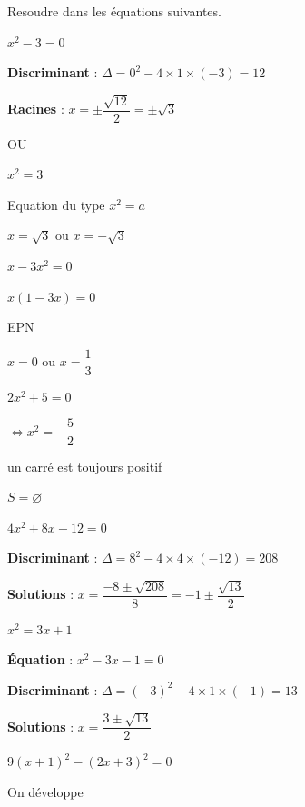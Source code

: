 \documentclass[11pt,a4paper]{article}  %
\begin{document}
Resoudre dans \R les équations suivantes.
	\begin{enumMet}
		\item $x^2-3=0$
		\begin{corrBox}
			\begin{minipage}[c]{0.48\linewidth}
				\begin{itemMet}
					\item \textbf{Discriminant} : \( \Delta = 0^2 - 4 \times 1 \times (-3) = 12 \)
					\item \textbf{Racines} : \( x = \pm \dfrac{\sqrt{12}}{2} = \pm \sqrt{3} \)
				\end{itemMet}
			\end{minipage} \hfill
			\begin{minipage}[c]{0.48\linewidth}
				OU
				
				$x^2=3$
				
				Equation du type $x^2=a$
				
				$x=\sqrt{3}$ ou $x=-\sqrt{3}$
			\end{minipage}		
		\end{corrBox}
		\item $x-3 x^2=0$
		\begin{corrBox}
			$x(1-3x)=0$
			
			EPN
			
			$x=0$ ou $x=\dfrac{1}{3}$		
		\end{corrBox}
		\item $2 x^2+5=0$
		\begin{corrBox}
			$\iff x^2=-\dfrac{5}{2}$
			
			un carré est toujours positif
			
			$S=\varnothing$		
		\end{corrBox}
		\item $4 x^2+8 x-12=0$
		\begin{corrBox}
			\begin{itemMet}
				\item \textbf{Discriminant} : \( \Delta = 8^2 - 4 \times 4 \times (-12) = 208 \)
				\item \textbf{Solutions} : \( x = \dfrac{-8 \pm \sqrt{208}}{8} = -1 \pm \dfrac{\sqrt{13}}{2} \)
			\end{itemMet}		
		\end{corrBox}
		\item $x^2=3 x+1$
		\begin{corrBox}
			\textbf{Équation} : \( x^2 - 3x - 1 = 0 \)
			\begin{itemMet}
				\item \textbf{Discriminant} : \( \Delta = (-3)^2 - 4 \times 1 \times (-1) = 13 \)
				\item \textbf{Solutions} : \( x = \dfrac{3 \pm \sqrt{13}}{2} \)
			\end{itemMet}		
		\end{corrBox}
		\item $9(x+1)^2-(2 x+3)^2=0$
		\begin{corrBox}
			\begin{minipage}[c]{0.48\linewidth}
				On développe
				

\end{minipage}
\end{corrBox}
\end{enumMet}
\end{document}
